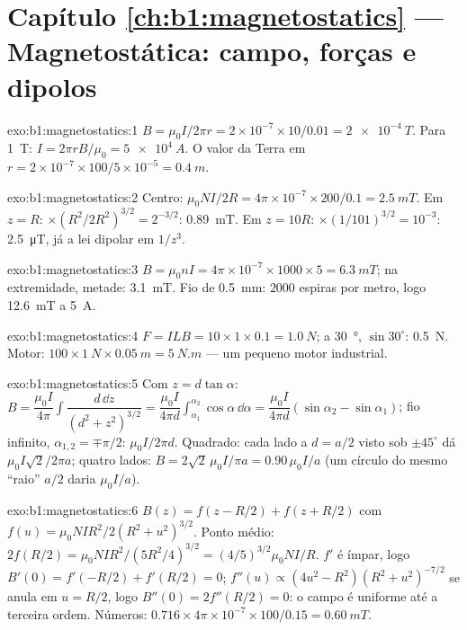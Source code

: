 \section*{Capítulo \ref{ch:b1:magnetostatics} --- Magnetostática: campo, forças e dipolos}

\begin{solution}{exo:b1:magnetostatics:1}
$B = \mu_0I/2\pi r = 2 \times 10^{-7} \times 10/0.01 = \qty{2e-4}{T}$. Para \qty{1}{T}:
$I = 2\pi rB/\mu_0 = \qty{5e4}{A}$. O valor da Terra em $r = 2 \times 10^{-7} \times
100/5 \times 10^{-5} = \qty{0.4}{m}$.
\end{solution}

\begin{solution}{exo:b1:magnetostatics:2}
Centro: $\mu_0NI/2R = 4\pi \times 10^{-7} \times 200/0.1 = \qty{2.5}{mT}$. Em $z = R$:
$\times(R^2/2R^2)^{3/2} = 2^{-3/2}$: \qty{0.89}{mT}. Em $z = 10R$: $\times(1/101)^{3/2}
= 10^{-3}$: \qty{2.5}{\micro T}, já a lei dipolar em $1/z^3$.
\end{solution}

\begin{solution}{exo:b1:magnetostatics:3}
$B = \mu_0nI = 4\pi \times 10^{-7} \times 1000 \times 5 = \qty{6.3}{mT}$; na extremidade,
metade: \qty{3.1}{mT}. Fio de \qty{0.5}{mm}: $2000$ espiras por metro, logo
\qty{12.6}{mT} a \qty{5}{A}.
\end{solution}

\begin{solution}{exo:b1:magnetostatics:4}
$F = ILB = 10 \times 1 \times 0.1 = \qty{1.0}{N}$; a \qty{30}{\degree}, $\sin30^\circ$:
\qty{0.5}{N}. Motor: $100 \times \qty{1}{N} \times \qty{0.05}{m} = \qty{5}{N.m}$ ---
um pequeno motor industrial.
\end{solution}

\begin{solution}{exo:b1:magnetostatics:5}
Com $z = d\tan\alpha$: $B = \dfrac{\mu_0I}{4\pi}\displaystyle\int\dfrac{d\,\dd z}{(d^2 + z^2)^{3/2}}
= \dfrac{\mu_0I}{4\pi d}\displaystyle\int_{\alpha_1}^{\alpha_2}\cos\alpha\,\dd\alpha = \dfrac{\mu_0I}{4\pi d}
(\sin\alpha_2 - \sin\alpha_1)$; fio infinito, $\alpha_{1,2} = \mp\pi/2$: $\mu_0I/2\pi d$.
Quadrado: cada lado a $d = a/2$ visto sob $\pm45^\circ$ dá $\mu_0I\sqrt2/2\pi a$;
quatro lados: $B = 2\sqrt2\,\mu_0I/\pi a = 0.90\,\mu_0I/a$ (um círculo do mesmo
``raio'' $a/2$ daria $\mu_0I/a$).
\end{solution}

\begin{solution}{exo:b1:magnetostatics:6}
$B(z) = f(z - R/2) + f(z + R/2)$ com $f(u) = \mu_0NIR^2/2(R^2 + u^2)^{3/2}$.
Ponto médio: $2f(R/2) = \mu_0NIR^2/(5R^2/4)^{3/2} = (4/5)^{3/2}\mu_0NI/R$. $f'$ é
ímpar, logo $B'(0) = f'(-R/2) + f'(R/2) = 0$; $f''(u) \propto (4u^2 - R^2)(R^2 +
u^2)^{-7/2}$ se anula em $u = R/2$, logo $B''(0) = 2f''(R/2) = 0$: o campo é
uniforme até a terceira ordem. Números: $0.716 \times 4\pi \times 10^{-7} \times 100/0.15 =
\qty{0.60}{mT}$.
\end{solution}

